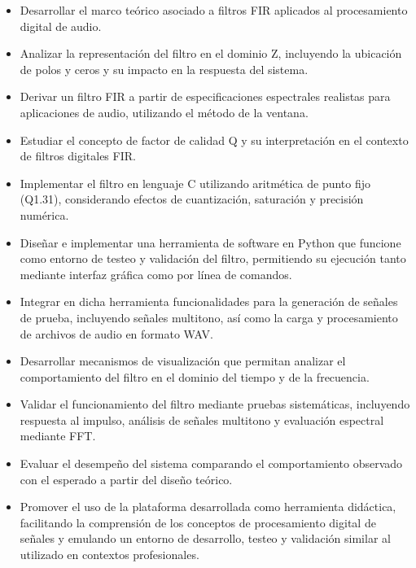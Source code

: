 \documentclass[a4,11pt]{article}
\begin{document}
\begin{itemize}
\item Desarrollar el marco teórico asociado a filtros FIR aplicados al procesamiento digital de audio.

\item Analizar la representación del filtro en el dominio Z, incluyendo la ubicación de polos y ceros y su impacto en la respuesta del sistema.

\item Derivar un filtro FIR a partir de especificaciones espectrales realistas para aplicaciones de audio, utilizando el método de la ventana.

\item Estudiar el concepto de factor de calidad Q y su interpretación en el contexto de filtros digitales FIR.

\item Implementar el filtro en lenguaje C utilizando aritmética de punto fijo (Q1.31), considerando efectos de cuantización, saturación y precisión numérica.

\item Diseñar e implementar una herramienta de software en Python que funcione como entorno de testeo y validación del filtro, permitiendo su ejecución tanto mediante interfaz gráfica como por línea de comandos.

\item Integrar en dicha herramienta funcionalidades para la generación de señales de prueba, incluyendo señales multitono, así como la carga y procesamiento de archivos de audio en formato WAV.

\item Desarrollar mecanismos de visualización que permitan analizar el comportamiento del filtro en el dominio del tiempo y de la frecuencia.

\item Validar el funcionamiento del filtro mediante pruebas sistemáticas, incluyendo respuesta al impulso, análisis de señales multitono y evaluación espectral mediante FFT.

\item Evaluar el desempeño del sistema comparando el comportamiento observado con el esperado a partir del diseño teórico.

\item Promover el uso de la plataforma desarrollada como herramienta didáctica, facilitando la comprensión de los conceptos de procesamiento digital de señales y emulando un entorno de desarrollo, testeo y validación similar al utilizado en contextos profesionales.
\end{itemize}
\end{document}
